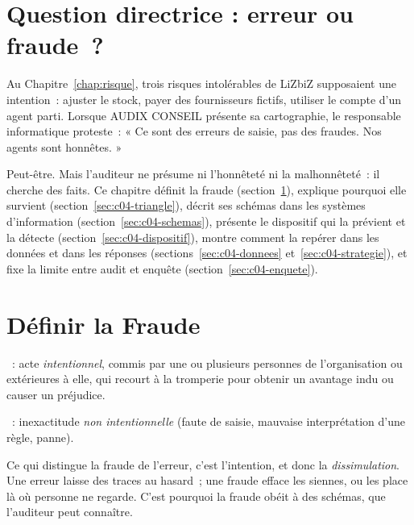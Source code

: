 \bigskip

\section*{Question directrice : erreur ou fraude~?}

Au Chapitre~\ref{chap:risque}, trois risques intolérables de LiZbiZ
supposaient une intention~: ajuster le stock, payer des fournisseurs
fictifs, utiliser le compte d'un agent parti. Lorsque AUDIX CONSEIL
présente sa cartographie, le responsable informatique proteste~: « Ce sont
des erreurs de saisie, pas des fraudes. Nos agents sont honnêtes. »

Peut-être. Mais l'auditeur ne présume ni l'honnêteté ni la malhonnêteté~: il
cherche des faits. Ce chapitre définit la fraude
(section~\ref{sec:c04-definir}), explique pourquoi elle survient
(section~\ref{sec:c04-triangle}), décrit ses schémas dans les systèmes
d'information (section~\ref{sec:c04-schemas}), présente le dispositif qui la
prévient et la détecte (section~\ref{sec:c04-dispositif}), montre comment
la repérer dans les données et dans les réponses
(sections~\ref{sec:c04-donnees} et~\ref{sec:c04-strategie}), et fixe la
limite entre audit et enquête (section~\ref{sec:c04-enquete}).

\separateur

\section{Définir la Fraude}
\label{sec:c04-definir}

\begin{boxdef}
~: acte \emph{intentionnel}, commis par une ou
plusieurs personnes de l'organisation ou extérieures à elle, qui recourt à
la tromperie pour obtenir un avantage indu ou causer un préjudice.

\medskip
{}~: inexactitude \emph{non intentionnelle}
(faute de saisie, mauvaise interprétation d'une règle, panne).
\end{boxdef}

Ce qui distingue la fraude de l'erreur, c'est l'intention, et donc la
\emph{dissimulation}. Une erreur laisse des traces au hasard~; une fraude
efface les siennes, ou les place là où personne ne regarde. C'est pourquoi
la fraude obéit à des schémas, que l'auditeur peut connaître.

